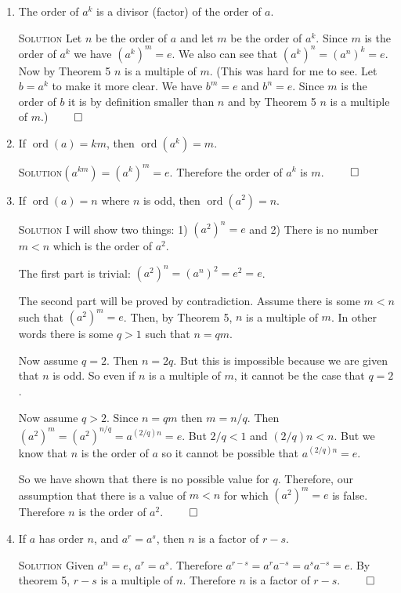 \documentclass[twoside]{amsart}
\newcommand{\solution}{\textsc{Solution}\xspace}
\newcommand{\blank}{\vspace{5pt}}
\newcommand{\itm}{\blank\item}
\newcommand{\sol}{\blank\noindent\solution}
\newcommand{\ord}{\mathop{\mathrm{ord}}}
\begin{document}
\begin{enumerate}[A.]
\begin{enumerate}[1]
      \itm The order of $a^k$ is a divisor (factor) of the order of $a$.

      \sol Let $n$ be the order of $a$ and let $m$ be the order of 
      $a^k$. Since $m$ is the order of $a^k$ we have 
      $(a^k)^m = e$. We also can see that $(a^k)^n = (a^n)^k = e$.
      Now by Theorem 5 $n$ is a multiple of $m$. (This was hard for 
      me to see. Let $b = a^k$ to make it more clear. We have
      $b^m = e$ and $b^n = e$. Since $m$ is the order of $b$ it
      is by definition smaller than $n$ and by Theorem 5 $n$ is a 
      multiple of $m$.) $\qed$

      \itm If $\ord(a) = km$, then $\ord(a^k) = m$.

      \sol $(a^{km}) = (a^k) ^m = e$. Therefore the order of $a^k$ is $m$.
      $\qed$

      \itm If $\ord(a) = n$ where $n$ is odd, then $\ord(a^2) = n$.

      \sol I will show two things: 1) $(a^2)^n = e$ and 2)
      There is no number $m < n$ which is the order of $a^2$.

      The first part is trivial: $(a^2)^n = (a^n)^2 = e^2 = e$.

      The second part will be proved by contradiction. Assume there is
      some $m < n$ such that $(a^2)^m = e$. Then, by Theorem 5, $n$
      is a multiple of $m$. In other words there is some $q > 1$ 
      such that $n = qm$.

      Now assume $q=2$. Then $n=2q$. But this is impossible because we
      are given that $n$ is odd. So even if $n$ is a multiple of $m$, 
      it cannot be the case that $q=2$.

      Now assume $q > 2$. Since $n=qm$ then $m=n/q$.
      Then  $(a^2)^m = (a^2)^{n/q} = a^{(2/q)n} = e$. But $2/q < 1$
      and $(2/q)n < n$.  But we know that $n$ is the order of $a$
      so it cannot be possible that $a^{(2/q)n} = e$.

      So we have shown that there is no possible value for $q$. Therefore,
      our assumption that there is a value of $m < n$ for which
      $(a^2)^m = e$ is false. Therefore $n$ is the order of $a^2$. $\qed$
      
      \itm If $a$ has order $n$, and $a^r = a^s$, then $n$ is a factor
      of $r-s$.

      \sol Given $a^n = e$, $a^r = a^s$. Therefore
      $a^{r-s} = a^r a^{-s} = a^s a^{-s} = e$. By theorem 5, $r-s$ is
      a multiple of $n$. Therefore $n$ is a factor of $r-s$. $\qed$


\end{enumerate}
\end{enumerate}
\end{document}

